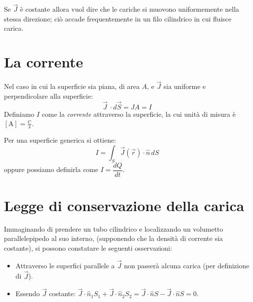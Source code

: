 \documentclass{book}
\begin{document}
Se $\vec{J}$ \`e costante allora vuol dire che le cariche si muovono uniformemente nella stessa direzione; ci\`o accade frequentemente
in un filo cilindrico in cui fluisce carica.

\section{La corrente}
Nel caso in cui la superficie sia piana, di area $A$, e $\vec{J}$ sia uniforme e perpendicolare alla superficie: 
\[
\vec{J}\ \cdot d\vec{S}=J A=I
\]
Definiamo $I$ come la \emph{corrente} attraverso la superficie, la cui unità di misura è $[\text{A}] = \frac{\text{C}}{\text{s}}$.

Per una superficie generica si ottiene:
\[
I = \int_S \vec{J}(\vec{r}) \cdot \hat{n}\,d{S} 
\]
oppure possiamo definirla come $I=\dfrac{dQ}{dt}$.

\section{Legge di conservazione della carica}
Immaginando di prendere un tubo cilindrico e localizzando un volumetto parallelepipedo al suo interno, (supponendo che la densit\`a di corrente sia costante), si possono constatare le seguenti osservazioni:
\begin{itemize}
  \item Attraverso le superfici parallele a $\vec{J}$ non passer\`a alcuna carica (per definizione di $\vec{J}$).
  \item Essendo $\vec{J}$ costante: $\vec{J} \cdot \hat{n}_1 S_1 + \vec{J} \cdot \hat{n}_2 S_2 = \vec{J} \cdot \hat{n} S - \vec{J} \cdot \hat{n} S = 0 $.
\end{itemize}
\end{document}
